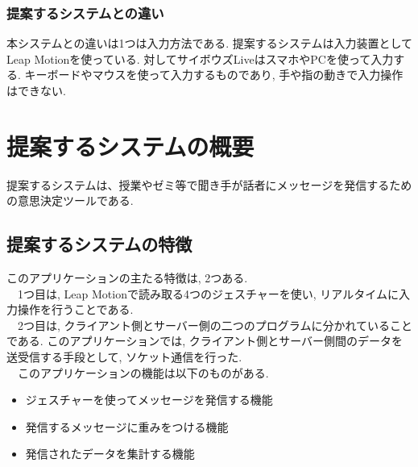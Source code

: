 \documentclass{funthesis}
\begin{document}
\subsection{提案するシステムとの違い}
本システムとの違いは1つは入力方法である. 提案するシステムは入力装置としてLeap Motionを使っている. 対してサイボウズLiveはスマホやPCを使って入力する. キーボードやマウスを使って入力するものであり, 手や指の動きで入力操作はできない. 

\chapter{提案するシステムの概要}

提案するシステムは、授業やゼミ等で聞き手が話者にメッセージを発信するための意思決定ツールである. 

\section{提案するシステムの特徴}


このアプリケーションの主たる特徴は, 2つある.\\
　1つ目は, Leap Motionで読み取る4つのジェスチャーを使い, リアルタイムに入力操作を行うことである. \\
　2つ目は, クライアント側とサーバー側の二つのプログラムに分かれていることである. このアプリケーションでは, クライアント側とサーバー側間のデータを送受信する手段として, ソケット通信を行った. \\
　このアプリケーションの機能は以下のものがある.
\begin{itemize}
 \item ジェスチャーを使ってメッセージを発信する機能
 \item 発信するメッセージに重みをつける機能
 \item 発信されたデータを集計する機能
\end{itemize}
\end{document}
